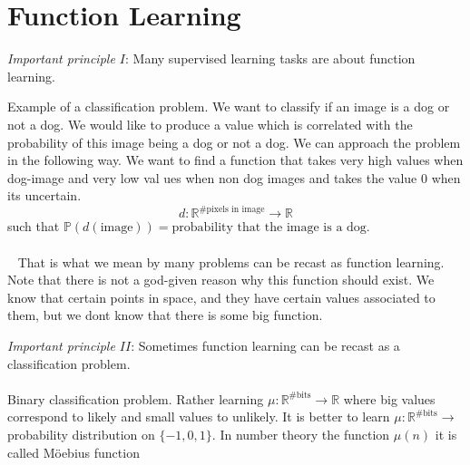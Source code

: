 \documentclass[../main.tex]{subfiles}
\begin{document}
	\section{Function Learning}
	\noindent
	\textit{Important principle $I$}: Many supervised learning tasks are about function learning. 

\begin{xmpl} Example of a classification problem. We want to classify if an image is a dog or not a dog. We would like to produce a value which is correlated with the probability of this image being a dog or not a dog.  We can approach the problem in the following way. We want to find a function that takes very high values when dog-image and very low val ues when non dog images and takes the value 0 when its uncertain. 
	$$d: \mathbb{R}^{\# \text{pixels in image}} \rightarrow \mathbb{R} $$
	such that $\mathbb{P}(d(\text{image})) = \text{probability that the image is a dog.}$ \\ \\  
	That is what we mean by many problems can be recast as function learning. Note that there is not a god-given reason why this function should exist. We know that certain points in space, and they have certain values associated to them, but we dont know that there is some big function. 
\end{xmpl}

\noindent \textit{Important principle $II$}: Sometimes function learning can be recast as a classification problem.  
\\ \\ 
Binary classification problem. 
Rather learning $\mu : \mathbb{R}^{\# \text{bits}} \rightarrow \mathbb{R}$ where big values correspond to likely and small values to unlikely. It is better to learn $\mu : \mathbb{R}^{\# \text{bits}} \rightarrow $ probability distribution on $\{-1,0,1\}$. In number theory the function $\mu(n)$ it is called Möebius function 
	
\end{document}
